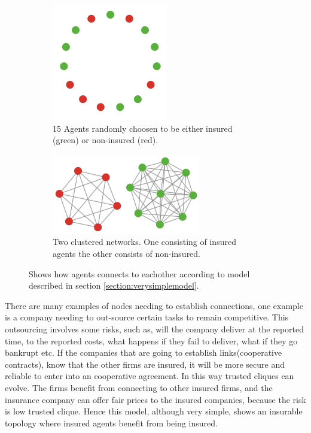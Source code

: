 \begin{figure}[h]
\centering
\begin{subfigure}{.5\textwidth}
  \centering
  \includegraphics[width=0.4\linewidth]{../Figures/firstModelWithNoParameters1.png}
  \caption{\label{fig:firstmod1} 15 Agents randomly choosen to be either insured (green) or non-insured (red).}
\end{subfigure}
\quad
\begin{subfigure}{.46\textwidth}
  \centering
  \includegraphics[width=0.8\linewidth]{../Figures/firstModelWithNoParameters2.png}
  \caption{\label{fig:firstmod2} Two clustered networks. One consisting of insured agents the other consists of non-insured.}
\end{subfigure}
\caption{\label{fig:fincont} Shows how agents connects to eachother according to model described in section \ref{section:verysimplemodel}.}
\end{figure}


There are many examples of nodes needing to establish connections, one example is a company needing to out-source certain tasks to remain competitive. This outsourcing involves some risks, such as, will the company deliver at the reported time, to the reported costs, what happens if they fail to deliver, what if they go bankrupt etc. If the companies that are going to establish links(cooperative contracts), know that the other firms are insured, it will be more secure and reliable to enter into an cooperative agreement. In this way trusted cliques can evolve. The firms benefit from connecting to other insured firms, and the insurance company can offer fair prices to the insured companies, because the risk is low trusted clique.
Hence this model, although very simple, shows an insurable topology where insured agents benefit from being insured. 



